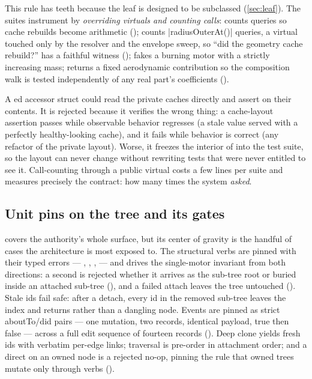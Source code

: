 This rule has teeth because the leaf is designed to be subclassed (\cref{sec:leaf}). The suites
instrument by \emph{overriding virtuals and counting calls}:  counts
 queries so cache rebuilds become arithmetic
();  counts
\cppinline|radiusOuterAt()| queries, a virtual touched only by the resolver and the envelope
sweep, so ``did the geometry cache rebuild?'' has a faithful witness
();  fakes a burning motor
with a strictly increasing mass;  returns a fixed aerodynamic contribution so
the composition walk is tested independently of any real part's coefficients
().

\begin{rejected}
A ed accessor struct could read the private caches directly and assert on their
contents. It is rejected because it verifies the wrong thing: a cache-layout assertion passes
while observable behavior regresses (a stale value served with a perfectly healthy-looking cache),
and it fails while behavior is correct (any refactor of the private layout). Worse, it freezes the
interior of  into the test suite, so the layout can never change without rewriting
tests that were never entitled to see it. Call-counting through a public virtual costs a few lines
per suite and measures precisely the contract: how many times the system \emph{asked}.
\end{rejected}

\subsection{Unit pins on the tree and its gates}\label{sec:verification-unit}

 covers the authority's whole surface, but its center of gravity is the
handful of cases the architecture is most exposed to. The structural verbs are pinned with their
typed errors --- , , ,  --- and
 drives the single-motor invariant from both directions: a second
 is rejected whether it arrives as the sub-tree root or buried inside an attached
sub-tree (), and a failed attach leaves the tree untouched
(). Stale ids fail safe: after a detach, every id
in the removed sub-tree leaves the index and  returns  rather than a
dangling node. Events are pinned as strict aboutTo/did pairs --- one mutation, two records,
identical payload,  true then false --- across a full edit sequence of fourteen
records (). Deep clone yields fresh ids with
verbatim per-edge links; traversal is pre-order in attachment order; and a direct
 on an owned node is a rejected no-op, pinning the rule that owned trees mutate
only through verbs ().


